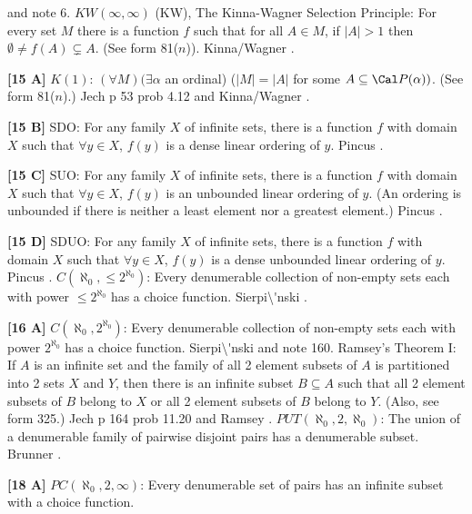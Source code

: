 \cite{2004} and note 6.
\medskip
{} $KW(\infty,\infty)$ (KW), The Kinna-Wagner Selection
Principle: For every  set $M$ there is a function $f$ such that
for all $A\in M$, if $|A|>1$ then $\emptyset\neq f(A)\subsetneq A$.
(See form 81($n$)).  \ac{Kinna/Wagner} \cite{1955}.
\smallskip
\item{}{\bf [15 A]} $K(1)$: $(\forall M)(\exists\alpha$ an
ordinal) ($|M| = |A|$ for some $A \subseteq {\Cal P}(\alpha))$.
(See form 81($n$).) \ac{Jech} \cite{1973b} p 53 prob  4.12 and
\ac{Kinna/Wagner} \cite{1955}.
\smallskip
\item{}{\bf [15 B]} SDO: For any family $X$ of infinite sets, there is a
function $f$ with domain $X$ such that $\forall y\in X$, $f(y)$ is a dense
linear ordering of $y$.  \ac{Pincus} \cite{1997}.
\smallskip
\item{}{\bf [15 C]} SUO: For any family $X$ of infinite sets, there is a
function $f$ with domain $X$ such that $\forall y\in X$, $f(y)$ is an
unbounded linear ordering of $y$. (An ordering is unbounded if there
is neither a least element nor a greatest element.) \ac{Pincus} \cite{1997}.
\smallskip
\item{}{\bf [15 D]} SDUO: For any family $X$ of infinite sets, there is a
function $f$ with domain $X$ such that $\forall y\in X$, $f(y)$ is
a dense unbounded linear ordering of $y$. \ac{Pincus} \cite{1997}.
\medskip
{}  $C(\aleph_{0},\le 2^{\aleph_{0}})$:  Every denumerable
collection of non-empty sets  each with power $\le  2^{\aleph_{0}}$
has a choice function.  \ac{Sierpi\'nski} \cite{1918}.
\medskip
\item{}{\bf [16 A]} $C(\aleph_0,2^{\aleph_0})$:  Every denumerable
collection of non-empty sets each with power $2^{\aleph_{0}}$ has a choice
function.  \ac{Sierpi\'nski} \cite{1918} and note 160.
\medskip
{} Ramsey's Theorem I: If $A$ is an infinite set and the
family of all 2 element subsets of $A$ is partitioned into 2 sets $X$ and
$Y$, then there is an infinite subset $B\subseteq A$ such that all 2
element subsets of $B$ belong to $X$ or all 2 element subsets of $B$
belong to $Y$. (Also, see form 325.) \ac{Jech} \cite{1973b} p 164 prob
11.20 and \ac{Ramsey} \cite{1929}. 
\medskip
{} $PUT(\aleph_{0},2,\aleph_{0})$:  The union of a
denumerable family of pairwise disjoint pairs has a denumerable subset.
\ac{Brunner} \cite{1984f}.
\smallskip
\item{}{\bf [18 A]}  $PC(\aleph_{0},2,\infty)$:  Every denumerable set
of  pairs has an infinite subset with  a choice function.
